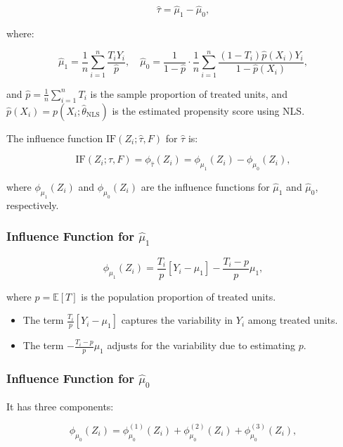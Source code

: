 \documentclass{article}
\begin{document}
\[
\hat{\tau} = \hat{\mu}_1 - \hat{\mu}_0,
\]

where:

\[
\hat{\mu}_1 = \frac{1}{n} \sum_{i=1}^n \frac{T_i Y_i}{\hat{p}},
\quad
\hat{\mu}_0 = \frac{1}{1 - \hat{p}} \cdot \frac{1}{n} \sum_{i=1}^n \frac{(1 - T_i) \hat{p}(X_i) Y_i}{1 - \hat{p}(X_i)},
\]

and \(\hat{p} = \frac{1}{n} \sum_{i=1}^n T_i\) is the sample proportion of treated units, and \(\hat{p}(X_i) = p(X_i; \hat{\theta}_{\text{NLS}})\) is the estimated propensity score using NLS.

The influence function \(\text{IF}(Z_i; \hat{\tau}, F)\) for \(\hat{\tau}\) is:

\[
\text{IF}(Z_i; \hat{\tau}, F) = \phi_{\hat{\tau}}(Z_i) = \phi_{\mu_1}(Z_i) - \phi_{\mu_0}(Z_i),
\]

where \(\phi_{\mu_1}(Z_i)\) and \(\phi_{\mu_0}(Z_i)\) are the influence functions for \(\hat{\mu}_1\) and \(\hat{\mu}_0\), respectively.

\subsubsection*{Influence Function for \( \hat{\mu}_1 \)}

\[
\phi_{\mu_1}(Z_i) = \frac{T_i}{p} [Y_i - \mu_1] - \frac{T_i - p}{p} \mu_1,
\]

where \(p = \mathbb{E}[T]\) is the population proportion of treated units.

\begin{itemize}
    \item The term \(\frac{T_i}{p} [Y_i - \mu_1]\) captures the variability in \(Y_i\) among treated units.
    \item The term \(-\frac{T_i - p}{p} \mu_1\) adjusts for the variability due to estimating \(p\).
\end{itemize}

\subsubsection*{Influence Function for \( \hat{\mu}_0 \)}

It has three components:

\[
\phi_{\mu_0}(Z_i) = \phi_{\mu_0}^{(1)}(Z_i) + \phi_{\mu_0}^{(2)}(Z_i) + \phi_{\mu_0}^{(3)}(Z_i),
\]
\end{document}
